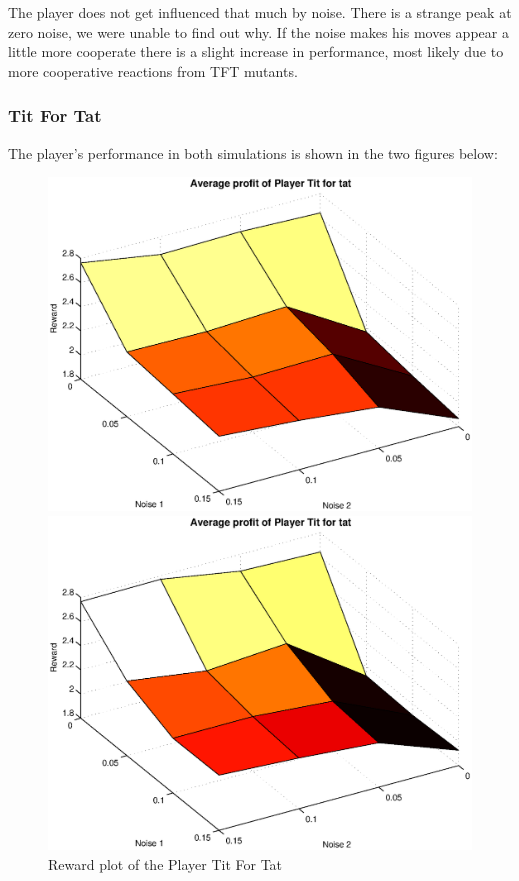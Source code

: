\documentclass[11pt,twoside]{article}
\begin{document}
The player does not get influenced that much by noise. There is a strange peak at zero noise, we were unable to find out why. If the noise makes his moves appear a little more cooperate there is a slight increase in performance, most likely due to more cooperative reactions from TFT mutants.

\newpage
\subsubsection{Tit For Tat}
The player's performance in both simulations is shown in the two figures below:
\begin{figure}[h]

\begin{minipage}[hbt]{0.65\textwidth}
	\centering
	\includegraphics[width=\textwidth]{pics/simulation1/Reward_vs_Noise_of_Player_Tit_for_tat}
\end{minipage}
\hfill
\begin{minipage}[hbt]{0.3\textwidth}
	\centering
	\includegraphics[width=\textwidth]{pics/simulation2/Reward_vs_Noise_of_Player_Tit_for_tat}
\end{minipage}
	\caption{Reward plot of the Player Tit For Tat}
	\label{pic player tit for tat}
\end{figure}
\end{document}
